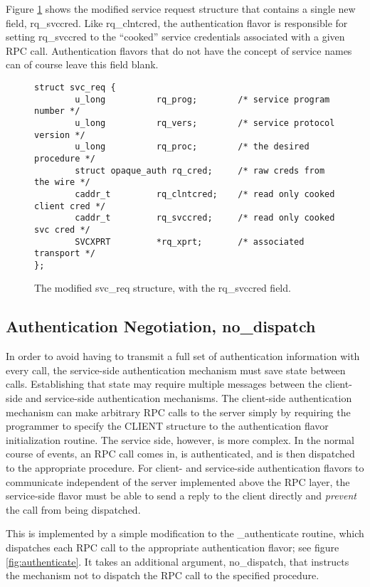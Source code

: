 Figure \ref{fig:svc-req} shows the modified service request structure
that contains a single new field, rq_svccred.  Like rq_clntcred, the
authentication flavor is responsible for setting rq_svccred to the
``cooked'' service credentials associated with a given RPC call.
Authentication flavors that do not have the concept of service names
can of course leave this field blank.

\begin{figure}[htbp]
\begin{verbatim}
struct svc_req {
        u_long          rq_prog;        /* service program number */
        u_long          rq_vers;        /* service protocol version */
        u_long          rq_proc;        /* the desired procedure */
        struct opaque_auth rq_cred;     /* raw creds from the wire */
        caddr_t         rq_clntcred;    /* read only cooked client cred */
        caddr_t         rq_svccred;     /* read only cooked svc cred */
        SVCXPRT         *rq_xprt;       /* associated transport */
};
\end{verbatim}
\caption{The modified svc_req structure, with the rq_svccred field.}
\label{fig:svc-req}
\end{figure}



\subsection{Authentication Negotiation, no_dispatch}

In order to avoid having to transmit a full set of authentication
information with every call, the service-side authentication mechanism
must save state between calls.  Establishing that state may require
multiple messages between the client-side and service-side
authentication mechanisms.  The client-side authentication mechanism
can make arbitrary RPC calls to the server simply by requiring the
programmer to specify the CLIENT structure to the authentication
flavor initialization routine.  The service side, however, is more
complex.  In the normal course of events, an RPC call comes in, is
authenticated, and is then dispatched to the appropriate procedure.
For client- and service-side authentication flavors to communicate
independent of the server implemented above the RPC layer, the
service-side flavor must be able to send a reply to the client
directly and {\it prevent} the call from being dispatched.

This is implemented by a simple modification to the _authenticate
routine, which dispatches each RPC call to the appropriate
authentication flavor; see figure \ref{fig:authenticate}.  It takes an
additional argument, no_dispatch, that instructs the mechanism not to
dispatch the RPC call to the specified procedure.

